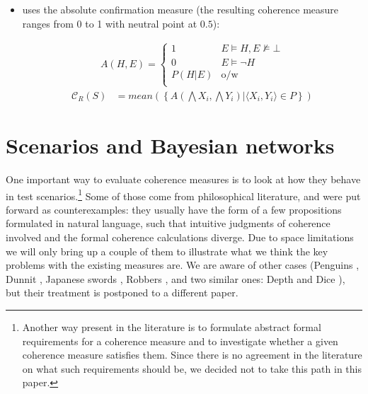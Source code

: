 \documentclass[10pt,]{scrartcl}
\begin{document}
\begin{itemize}


\item  \citet{Roche2013Coherence} uses the
absolute confirmation measure (the resulting coherence measure ranges from 0 to 1 with neutral point at $0.5$): 

\begin{align*}
    A(H,E) = \begin{cases}
    1 & E\models H, E\not \models \bot \\
    0 & E \models \neg H\\
    P(H|E) & \mbox{o/w} \\
    \end{cases}
\end{align*}
\begin{align}
\tag{Roche}  
    \mathcal{C}_{R}(S) & =
mean\left(\left\{A(\bigwedge X_i, \bigwedge Y_i) | \langle X_i, Y_i\rangle \in P\right\} \right) 
\end{align}



\end{itemize}











\section{Scenarios and Bayesian networks}\label{sec:senariosAndBns}


One important way to evaluate coherence measures is to look at how they behave in test scenarios.\footnote{Another way present in the literature is to formulate abstract formal requirements for a coherence measure and to investigate whether a given coherence measure satisfies them. Since there is no agreement in the literature on what such requirements should be, we decided not to take this path in this paper.}
 Some of those come from philosophical literature, and were put forward as counterexamples: they usually have the form of a few propositions formulated in natural language, such that intuitive judgments of coherence involved and the formal coherence calculations  diverge.  Due to space limitations we will only bring up a couple of them to illustrate what we think the key problems with the existing measures are. We are aware of other cases (Penguins \citep{bovens2004bayesian,Meijs2007Alleged},  Dunnit \citep{Merricks1995}, 
Japanese swords \citep{Meijs2007Alleged}, 
Robbers \citep{Siebel2004On-Fitelsons-me},
and two similar ones: Depth and 
Dice  \citep{Akiba2000Shogenjis,Shogenji2001Reply,Schippers2019General}), but their  treatment is postponed to a different paper.
\end{document}
